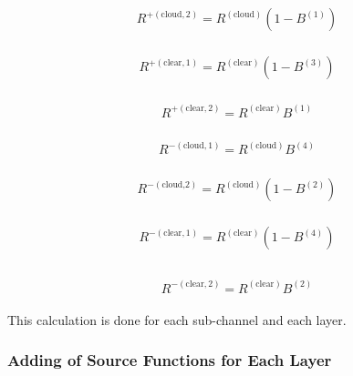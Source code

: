 \begin{eqnarray}
\begin{array}{l}
R^{+(\text {cloud}, 2)}=R^{(\text {cloud})}\left(1-B^{(1)}\right)
\end{array}
\end{eqnarray}

\begin{eqnarray}
\begin{array}{l}
R^{+(\text {clear}, 1)}=R^{(\text {clear})}\left(1-B^{(3)}\right)
\end{array}
\end{eqnarray}

\begin{eqnarray}
\begin{array}{l}
R^{+(\text {clear}, 2)}=R^{(\text {clear})} B^{(1)}
\end{array}
\end{eqnarray}

\begin{eqnarray}
\begin{array}{l}
R^{-(\text {cloud}, 1)}=R^{(\text {cloud})} B^{(4)}
\end{array}
\end{eqnarray}

\begin{eqnarray}
\begin{array}{l}
R^{-(\text {cloud,2})}=R^{(\text {cloud})}\left(1-B^{(2)}\right)
\end{array}
\end{eqnarray}

\begin{eqnarray}
\begin{array}{l}
R^{-(\text {clear}, 1)}=R^{(\text {clear})}\left(1-B^{(4)}\right) \\
\end{array}
\end{eqnarray}

\begin{eqnarray}
\begin{array}{l}
R^{-(\text {clear}, 2)}=R^{(\text {clear})} B^{(2)}
\end{array}
\end{eqnarray}

This calculation is done for each sub-channel and each layer.

\hypertarget{adding-of-source-functions-for-each-layer}{%
\subsubsection{Adding of Source Functions for Each
Layer}\label{adding-of-source-functions-for-each-layer}}

